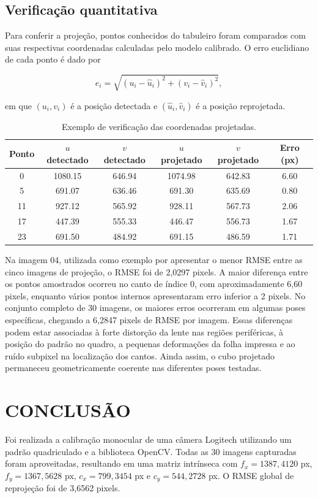 \documentclass[12pt, a4paper, twoside, chapter=TITLE, subsection=TITLE, section=TITLE, subsubsection=TITLE, subsubsubsection=TITLE, english, german, brazil]{abntex2}
\begin{document}
\section{Verificação quantitativa}
Para conferir a projeção, pontos conhecidos do tabuleiro foram comparados com suas respectivas coordenadas calculadas pelo modelo calibrado. O erro euclidiano de cada ponto é dado por

\begin{equation}
 e_i = \sqrt{(u_i-\hat{u}_i)^2 + (v_i-\hat{v}_i)^2},
\end{equation}

em que $(u_i,v_i)$ é a posição detectada e $(\hat{u}_i,\hat{v}_i)$ é a posição reprojetada.

\begin{table}[H]
\centering
\caption{Exemplo de verificação das coordenadas projetadas.}
\label{tab:verificacao}
\small
\begin{tabular}{cccccc}
\toprule
Ponto & $u$ detectado & $v$ detectado & $u$ projetado & $v$ projetado & Erro (px) \\
\midrule
0 & 1080.15 & 646.94 & 1074.98 & 642.83 & 6.60 \\
5 & 691.07 & 636.46 & 691.30 & 635.69 & 0.80 \\
11 & 927.12 & 565.92 & 928.11 & 567.73 & 2.06 \\
17 & 447.39 & 555.33 & 446.47 & 556.73 & 1.67 \\
23 & 691.50 & 484.92 & 691.15 & 486.59 & 1.71 \\
\bottomrule
\end{tabular}
\end{table}

Na imagem 04, utilizada como exemplo por apresentar o menor RMSE entre as cinco imagens de projeção, o RMSE foi de 2,0297 pixels. A maior diferença entre os pontos amostrados ocorreu no canto de índice 0, com aproximadamente 6,60 pixels, enquanto vários pontos internos apresentaram erro inferior a 2 pixels. No conjunto completo de 30 imagens, os maiores erros ocorreram em algumas poses específicas, chegando a 6,2847 pixels de RMSE por imagem. Essas diferenças podem estar associadas à forte distorção da lente nas regiões periféricas, à posição do padrão no quadro, a pequenas deformações da folha impressa e ao ruído subpixel na localização dos cantos. Ainda assim, o cubo projetado permaneceu geometricamente coerente nas diferentes poses testadas.

\chapter{CONCLUSÃO}
Foi realizada a calibração monocular de uma câmera Logitech utilizando um padrão quadriculado e a biblioteca OpenCV. Todas as 30 imagens capturadas foram aproveitadas, resultando em uma matriz intrínseca com $f_x=1387,4120$ px, $f_y=1367,5628$ px, $c_x=799,3454$ px e $c_y=544,2728$ px. O RMSE global de reprojeção foi de 3,6562 pixels.
\end{document}
